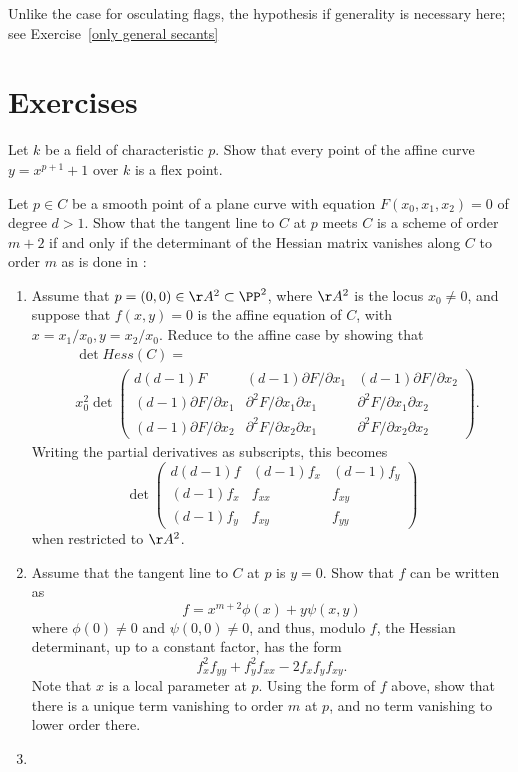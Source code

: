 Unlike the case for osculating flags, the hypothesis if generality is necessary here; see Exercise~\ref{only general secants}



\section{Exercises}
\begin{exercise}\label{inseparable Gauss}
Let $k$ be a field of characteristic $p$. Show that every point of the affine curve $y = x^{p+1}+1$ over $k$ is a flex point.
 
\end{exercise}

\begin{exercise}\label{Hessian exercise} 
Let $p\in C$ be a smooth point of a  plane curve with equation $F(x_0,x_1,x_2) = 0$ of degree $d>1$. Show that the tangent line to $C$ at $p$ meets
$C$ is a scheme of order $m+2$ if and only if the determinant of the Hessian matrix vanishes
along $C$ to order $m$ as is done in \cite[pp. 84--85]{Kunz}:

\begin{enumerate}
\item Assume that $p = (0,0)\in \AA^2\subset \PP^2$, where $\AA^2$ is the locus $x_0\neq 0$, 
and suppose that $f(x,y) =0$ is the affine equation of $C$, with $x= x_1/x_0, y = x_2/x_0$.
Reduce to the affine case by showing that
$$
\begin{aligned}
&\det Hess(C) = \\
&x_0^2 \det 
\begin{pmatrix}
 d(d-1)F & (d-1) \partial F/\partial x_1 & (d-1) \partial F/\partial x_2 \\
 (d-1) \partial F/\partial x_1&\partial^2 F/\partial x_1 \partial x_1 & \partial^2 F/\partial x_1 \partial x_2\\
 (d-1) \partial F/\partial x_2 &\partial^2 F/\partial x_2 \partial x_1 & \partial^2 F/\partial x_2 \partial x_2 
\end{pmatrix} .
\end{aligned}
$$ 
Writing the partial derivatives as subscripts, this becomes
$$
\det \begin{pmatrix}
 d(d-1)f & (d-1) f_x & (d-1) f_y \\
 (d-1) f_x&f_{xx} & f_{xy}\\
 (d-1) f_y &f_{xy} & f_{yy}
\end{pmatrix}
$$ 
when restricted to $\AA^2$.

\item Assume that the tangent line to $C$ at $p$ is $y=0$. Show that $f$ can be written as
$$
f = x^{m+2}\phi(x) +y\psi(x,y)
$$
where $\phi(0) \neq 0$ and $\psi(0,0) \neq 0$, and thus, modulo $f$, the Hessian determinant,
up to a constant factor, 
has the form
$$
f_x^2f_{yy}+f_y^2f_{xx}-2f_xf_yf_{xy}.
$$
Note that $x$ is a local parameter at $p$. Using the form of $f$ above, show that there is a unique term vanishing to order $m$ at $p$,
and no term vanishing to lower order there.
\item
\end{enumerate}
\end{exercise}

